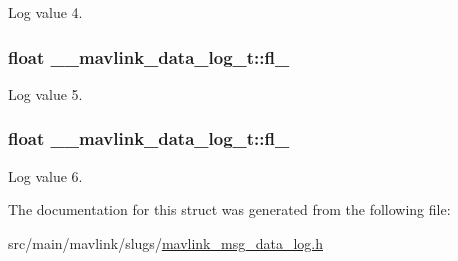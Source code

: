 Log value 4. 

\hypertarget{struct____mavlink__data__log__t_aa2484ed669af31a17a626024b0c6549a}{
\subsubsection[{fl\+\_\+5}]{\setlength{\rightskip}{0pt plus 5cm}float \+\_\+\+\_\+mavlink\+\_\+data\+\_\+log\+\_\+t\+::fl\+\_}}\label{struct____mavlink__data__log__t_aa2484ed669af31a17a626024b0c6549a}


Log value 5. 

\hypertarget{struct____mavlink__data__log__t_a9febb7a92176a9ae799b64c03a8f7e4e}{
\subsubsection[{fl\+\_\+6}]{\setlength{\rightskip}{0pt plus 5cm}float \+\_\+\+\_\+mavlink\+\_\+data\+\_\+log\+\_\+t\+::fl\+\_}}\label{struct____mavlink__data__log__t_a9febb7a92176a9ae799b64c03a8f7e4e}


Log value 6. 



The documentation for this struct was generated from the following file\+:\begin{DoxyCompactItemize}
\item 
src/main/mavlink/slugs/\hyperlink{mavlink__msg__data__log_8h}{mavlink\+\_\+msg\+\_\+data\+\_\+log.\+h}\end{DoxyCompactItemize}
